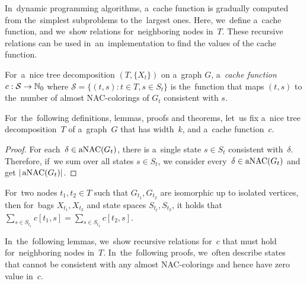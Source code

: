 In~dynamic programming algorithms, a~cache function is gradually computed
from the~simplest subproblems to the~largest ones.
Here, we~define a~cache function,
and we~show relations for~neighboring nodes in~\( T \).
These recursive relations can be used in~an~implementation
to find the values of the cache function.
%
\begin{definition}
	For~a~nice tree decomposition \( (T, \{X_t\}) \) on a~graph \( G \),
	a~\emph{cache function} \( c: \mathcal{S} \to \mathbb{N}_0 \)
	where \( \mathcal{S} = \{ (t,s): t \in T, s \in S_t \} \)
	is the~function that maps \( (t, s) \)
	to the~number of almost NAC-colorings of \( G_t \) consistent with \( s \).
\end{definition}
%
For~the~following definitions, lemmas, proofs and theorems, let~us fix
a~nice tree decomposition~\( T \) of a~graph~\( G \) that has width~\( k \),
and a~cache function~\( c \).
%
%
\begin{proof}
	For each~\( \delta \in \operatorname{aNAC}(G_t) \),
	there is a~single state \( s \in S_t \) consistent with~\( \delta \).
	Therefore, if~we sum over all states \( s \in S_t \),
	we consider every~\( \delta \in \operatorname{aNAC}(G_t) \) and get \( |\operatorname{aNAC}(G_t)| \).
\end{proof}
%
\begin{observation}
	For~two nodes \( t_1, t_2 \in T \) such that \( G_{t_1}, G_{t_2} \)
	are isomorphic up to isolated vertices,
	then for~bags \( X_{t_1}, X_{t_2} \) and state spaces \( S_{t_t}, S_{t_2} \),
	it holds that \( \sum_{s \in S_{t_1}} c[t_1, s] = \sum_{s \in S_{t_2}} c[t_2, s] \).
\end{observation}
%
%

In~the~following lemmas, we~show recursive relations for~\( c \) that must hold
for~neighboring nodes in~\( T \).
%
In~the~following proofs,
we~often describe states that cannot be consistent with
any almost NAC-colorings and hence have zero value in~\( c \).

